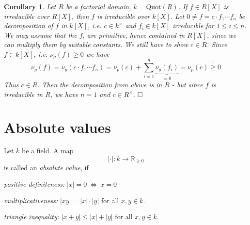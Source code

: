 \documentclass[11pt]{book}
\newtheorem{corollary}[theorem]{Corollary}
\theoremstyle{nonumberbreak}
\newenvironment{defin}[1][]{\ifthenelse{\equal{#1}{}}{\definition}{\definition[#1]}\rm}{\enddefinition}
\newenvironment{pr}[1][]{\ifthenelse{\equal{#1}{}}{\proof}{\proof[#1]}\rm}{\endproof}
\begin{document}
\begin{spacing}{1.3}
\begin{corollary} %
Let $R$ be a factorial domain, $k=\textrm{Quot}(R)$.
If $f \in R[X]$ is irreducible over $R[X]$, then $f$ is irreducible over $k[X]$.
\begin{pr}
Let $0\neq f = c \cdot f_1 \cdots f_n$ be decomposition of $f$ in $k[X]$, i.e. $c \in k^{\times}$ and $f_i \in k[X]$ irreducible for $1 \leqslant i \leqslant n$. We may assume that the $f_i$ are primitive, hence contained in  $R[X]$, since we can multiply them by suitable constants. We still have to show $c \in R$. Since $f \in k[X]$, i.e. $\nu_p(f) \geqslant 0$ we have
$$\nu_p(f)=\nu_p(c \cdot f_1 \cdots f_n)=\nu_p(c) + \sum_{i=1}^n \underbrace{\nu_p(f_i)}_{=0}=\nu_p(c)\overset{!}{\geqslant} 0$$
Thus $c \in R$. Then the decomposition from above is in $R$ - but since $f$ is irreducible in $R$, we have $n=1$ and $c \in R^{\times}$. $\hfill \Box$
\end{pr}
\end{corollary}
\newpage

\renewcommand*\thesection{§ \arabic{section}\quad}
\section{Absolute values}
\renewcommand*\thesection{\arabic{section}}

\begin{defin} %
Let $k$ be a field. A map $$| \cdot |: k \longrightarrow \mathbb{R}_{\geqslant 0}$$ is called an \textit{absolute value}, if
\begin{compactenum}
\item \textit{positive definiteness:} $|x|=0 \ \Longleftrightarrow \ x=0$
\item \textit{multiplicativeness:} $|xy|=|x|\cdot |y|$ for all $x,y \in k$.
\item \textit{triangle inequality:} $|x+y| \leqslant |x|+|y|$ for all $x,y \in k$.
\end{compactenum}
\end{defin}


\end{spacing}
\end{document}
